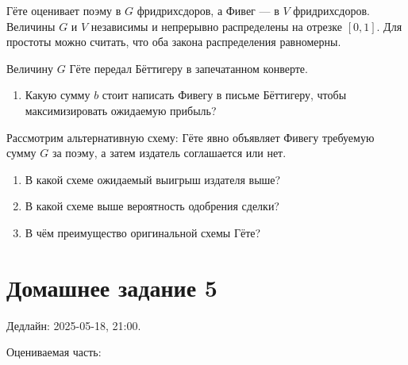 \documentclass[12pt]{article}
\begin{document}
\begin{enumerate}[resume]
Гёте оценивает поэму в $G$ фридрихсдоров, а Фивег — в $V$ фридрихсдоров. 
Величины $G$ и $V$ независимы и непрерывно распределены на отрезке $[0, 1]$.
Для простоты можно считать, что оба закона распределения равномерны. 

Величину $G$ Гёте передал Бёттигеру в запечатанном конверте. 

\begin{enumerate}
  \item Какую сумму $b$ стоит написать Фивегу в письме Бёттигеру, чтобы максимизировать ожидаемую прибыль?
\end{enumerate}

Рассмотрим альтернативную схему: Гёте явно объявляет Фивегу требуемую сумму $G$ за поэму, 
а затем издатель соглашается или нет.

\begin{enumerate}[resume]
  \item В какой схеме ожидаемый выигрыш издателя выше? 
  \item В какой схеме выше вероятность одобрения сделки?
  \item В чём преимущество оригинальной схемы Гёте?
\end{enumerate}



\end{enumerate}



\section*{Домашнее задание 5}

Дедлайн: 2025-05-18, 21:00.

Оцениваемая часть:
\end{document}
